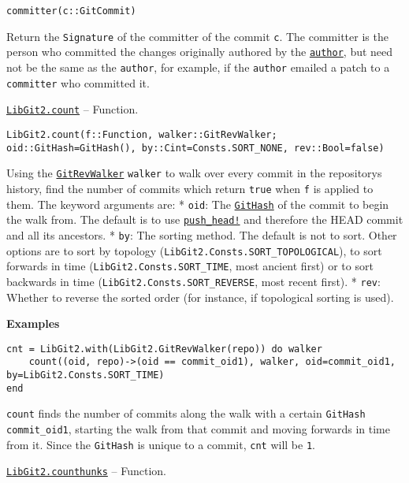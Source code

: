 \begin{adjustwidth}{2em}{0pt}


\begin{verbatim}
committer(c::GitCommit)
\end{verbatim}

Return the \texttt{Signature} of the committer of the commit \texttt{c}. The committer is the person who committed the changes originally authored by the \hyperlink{7024880280540966409}{\texttt{author}}, but need not be the same as the \texttt{author}, for example, if the \texttt{author} emailed a patch to a \texttt{committer} who committed it.



\end{adjustwidth}
\hypertarget{3202007276139600178}{}
\hyperlink{3202007276139600178}{\texttt{LibGit2.count}}  -- {Function.}

\begin{adjustwidth}{2em}{0pt}


\begin{verbatim}
LibGit2.count(f::Function, walker::GitRevWalker; oid::GitHash=GitHash(), by::Cint=Consts.SORT_NONE, rev::Bool=false)
\end{verbatim}

Using the \hyperlink{7800294839307043628}{\texttt{GitRevWalker}} \texttt{walker} to {\textquotedbl}walk{\textquotedbl} over every commit in the repository{\textquotesingle}s history, find the number of commits which return \texttt{true} when \texttt{f} is applied to them. The keyword arguments are:     * \texttt{oid}: The \hyperlink{202290709580230708}{\texttt{GitHash}} of the commit to begin the walk from. The default is to use       \hyperlink{9792433728015067335}{\texttt{push\_head!}} and therefore the HEAD commit and all its ancestors.     * \texttt{by}: The sorting method. The default is not to sort. Other options are to sort by       topology (\texttt{LibGit2.Consts.SORT\_TOPOLOGICAL}), to sort forwards in time       (\texttt{LibGit2.Consts.SORT\_TIME}, most ancient first) or to sort backwards in time       (\texttt{LibGit2.Consts.SORT\_REVERSE}, most recent first).     * \texttt{rev}: Whether to reverse the sorted order (for instance, if topological sorting is used).

\textbf{Examples}


\begin{verbatim}
cnt = LibGit2.with(LibGit2.GitRevWalker(repo)) do walker
    count((oid, repo)->(oid == commit_oid1), walker, oid=commit_oid1, by=LibGit2.Consts.SORT_TIME)
end
\end{verbatim}

\texttt{count} finds the number of commits along the walk with a certain \texttt{GitHash} \texttt{commit\_oid1}, starting the walk from that commit and moving forwards in time from it. Since the \texttt{GitHash} is unique to a commit, \texttt{cnt} will be \texttt{1}.



\end{adjustwidth}
\hypertarget{14766056021243867485}{}
\hyperlink{14766056021243867485}{\texttt{LibGit2.counthunks}}  -- {Function.}

